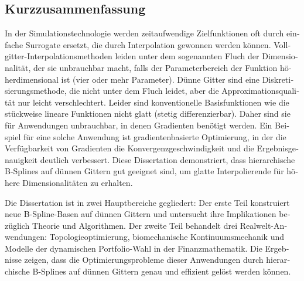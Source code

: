 \begin{otherlanguage}{ngerman}
  \section*{Kurzzusammenfassung}
  
  In der Simulationstechnologie werden zeitaufwendige Zielfunktionen
  oft durch einfache Surrogate ersetzt, die durch Interpolation
  gewonnen werden können.
  Vollgitter-Interpolationsmethoden leiden unter dem
  sogenannten Fluch der Dimensionalität,
  der sie unbrauchbar macht, falls der Parameterbereich der Funktion
  höherdimensional ist (vier oder mehr Parameter).
  Dünne Gitter sind eine Diskretisierungsmethode, die nicht unter
  dem Fluch leidet, aber die Approximationsqualität nur leicht verschlechtert.
  Leider sind konventionelle Basisfunktionen wie die stückweise
  lineare Funktionen nicht glatt (stetig differenzierbar).
  Daher sind sie für Anwendungen unbrauchbar, in denen Gradienten
  benötigt werden.
  Ein Beispiel für eine solche Anwendung ist gradientenbasierte Optimierung,
  in der die Verfügbarkeit von Gradienten die Konvergenzgeschwindigkeit und
  die Ergebnisgenauigkeit deutlich verbessert.
  Diese Dissertation demonstriert, dass hierarchische B-Splines auf
  dünnen Gittern gut geeignet sind,
  um glatte Interpolierende für höhere Dimensionalitäten zu erhalten.
  
  Die Dissertation ist in zwei Hauptbereiche gegliedert:
  Der erste Teil konstruiert neue B-Spline-Basen auf dünnen Gittern und
  untersucht ihre Implikationen bezüglich Theorie und Algorithmen.
  Der zweite Teil behandelt drei Realwelt-Anwendungen:
  Topologieoptimierung, biomechanische Kontinuumsmechanik und
  Modelle der dynamischen Portfolio-Wahl in der Finanzmathematik.
  Die Ergebnisse zeigen, dass die Optimierungsprobleme dieser
  Anwendungen durch hierarchische B-Splines auf dünnen Gittern
  genau und effizient gelöst werden können.
\end{otherlanguage}

\printornamentstrue
\cleardoublepage
